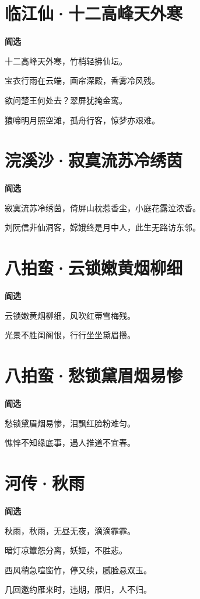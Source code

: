 \documentclass[12pt,a4paper]{ctexbook}
\begin{document}
\section{临江仙·十二高峰天外寒}
\textbf{阎选}\par\vspace{0.5em}
十二高峰天外寒，竹梢轻拂仙坛。\par
宝衣行雨在云端，画帘深殿，香雾冷风残。\par
欲问楚王何处去？翠屏犹掩金鸾。\par
猿啼明月照空滩，孤舟行客，惊梦亦艰难。\par

\section{浣溪沙·寂寞流苏冷绣茵}
\textbf{阎选}\par\vspace{0.5em}
寂寞流苏冷绣茵，倚屏山枕惹香尘，小庭花露泣浓香。\par
刘阮信非仙洞客，嫦娥终是月中人，此生无路访东邻。\par

\section{八拍蛮·云锁嫩黄烟柳细}
\textbf{阎选}\par\vspace{0.5em}
云锁嫩黄烟柳细，风吹红蒂雪梅残。\par
光景不胜闺阁恨，行行坐坐黛眉攒。\par

\section{八拍蛮·愁锁黛眉烟易惨}
\textbf{阎选}\par\vspace{0.5em}
愁锁黛眉烟易惨，泪飘红脸粉难匀。\par
憔悴不知缘底事，遇人推道不宜春。\par

\section{河传·秋雨}
\textbf{阎选}\par\vspace{0.5em}
秋雨，秋雨，无昼无夜，滴滴霏霏。\par
暗灯凉簟怨分离，妖姬，不胜悲。\par
西风稍急喧窗竹，停又续，腻脸悬双玉。\par
几回邀约雁来时，违期，雁归，人不归。\par
\end{document}
